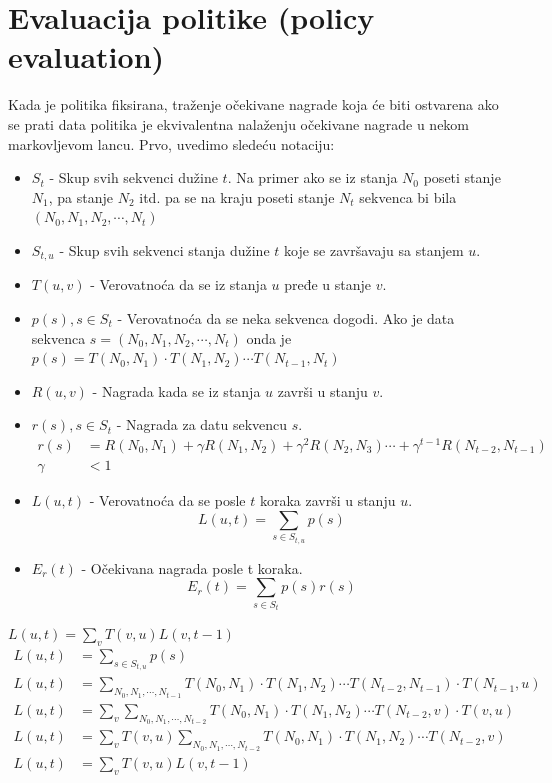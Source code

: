 \documentclass[a4paper,fleqn,12pt]{JMThesis}
\newcommand{\latin}{\fontencoding{T1}\selectfont\selectlanguage{english}}
\theoremstyle{plain}
\theoremstyle{definition}
\theoremstyle{definition}
\begin{document}
\section{Evaluacija politike ({\latin policy evaluation})}
Kada je politika fiksirana, traženje očekivane nagrade koja će biti ostvarena ako se prati data politika je ekvivalentna nalaženju očekivane nagrade u nekom markovljevom lancu. Prvo, uvedimo sledeću notaciju:
\begin{itemize}
	\item $S_t$ - Skup svih sekvenci dužine $t$. Na primer ako se iz stanja $N_0$ poseti stanje $N_1$, pa stanje $N_2$ itd. pa se na kraju poseti stanje $N_t$ sekvenca bi bila $(N_0, N_1, N_2, \cdots , N_t)$
 	\item $S_{t,u}$ - Skup svih sekvenci stanja dužine $t$ koje se završavaju sa stanjem $u$.
  	\item $T(u,v)$ - Verovatnoća da se iz stanja $u$ pređe u stanje $v$.
   	\item $p(s), s \in S_t$ - Verovatnoća da se neka sekvenca dogodi. Ako je data sekvenca $s=(N_0,N_1,N_2,\cdots , N_t)$ onda je $p(s) = T(N_0, N_1)\cdot T(N_1,N_2)\cdots T(N_{t-1},N_{t})$
    \item $R(u,v)$ - Nagrada kada se iz stanja $u$ završi u stanju $v$.
    \item $r(s), s \in S_t$ - Nagrada za datu sekvencu $s$. 
    \[ 
		\begin{split}
		r(s) &= R(N_0, N_1)+\gamma R(N_1,N_2) +\gamma^2 R(N_2,N_3) \cdots + \gamma^{t-1} R(N_{t-2},N_{t-1}) \\
		\gamma &< 1
		\end{split}
	\]
    \item $L(u,t)$ - Verovatnoća da se posle $t$ koraka završi u stanju $u$. 
	\[ 
		L(u,t) = \sum_{s \in S_{t,u}}p(s)
	\]
    \item $E_r(t)$ - Očekivana nagrada posle t koraka.
    \[
		E_r(t) = \sum_{s \in S_t}p(s)r(s)
	\]
\end{itemize}
\lem $L(u,t) = \sum_{v}T(v,u)L(v,t-1)$
\[
\begin{split}
	L(u,t) &= \sum_{s \in S_{t,u}}p(s)	\\
	L(u,t) &= \sum_{N_0, N_1, \cdots, N_{t-1}}T(N_0,N_1)\cdot T(N_1,N_2)\cdots T(N_{t-2},N_{t-1})\cdot T(N_{t-1},u)\\
	L(u,t) &= \sum_{v}\sum_{N_0, N_1,\cdots , N_{t-2}}T(N_0,N_1)\cdot T(N_1,N_2)\cdots T(N_{t-2},v) \cdot T(v,u)\\
	L(u,t) &= \sum_{v}T(v,u)\sum_{N_0, N_1,\cdots , N_{t-2}}T(N_0,N_1)\cdot T(N_1,N_2)\cdots T(N_{t-2},v)\\
	L(u,t) &= \sum_{v}T(v,u)L(v,t-1)
\end{split}
\]
\end{document}

